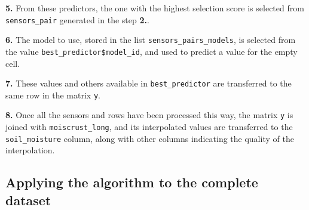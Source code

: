 \documentclass[]{article}
\newenvironment{Shaded}{\begin{snugshade}}{\end{snugshade}}
\newcommand{\DataTypeTok}[1]{\textcolor[rgb]{0.13,0.29,0.53}{#1}}
\newcommand{\DecValTok}[1]{\textcolor[rgb]{0.00,0.00,0.81}{#1}}
\newcommand{\KeywordTok}[1]{\textcolor[rgb]{0.13,0.29,0.53}{\textbf{#1}}}
\newcommand{\NormalTok}[1]{#1}
\newcommand{\OperatorTok}[1]{\textcolor[rgb]{0.81,0.36,0.00}{\textbf{#1}}}
\newcommand{\OtherTok}[1]{\textcolor[rgb]{0.56,0.35,0.01}{#1}}
\newcommand{\StringTok}[1]{\textcolor[rgb]{0.31,0.60,0.02}{#1}}
\begin{document}
\textbf{5.} From these predictors, the one with the highest selection
score is selected from \texttt{sensors\_pair} generated in the step
\textbf{2.}.

\begin{Shaded}
\end{Shaded}

\textbf{6.} The model to use, stored in the list
\texttt{sensors\_pairs\_models}, is selected from the value
\texttt{best\_predictor\$model\_id}, and used to predict a value for the
empty cell.

\begin{Shaded}
\end{Shaded}

\textbf{7.} These values and others available in
\texttt{best\_predictor} are transferred to the same row in the matrix
\texttt{y}.

\textbf{8.} Once all the sensors and rows have been processed this way,
the matrix \texttt{y} is joined with \texttt{moiscrust\_long}, and its
interpolated values are transferred to the \texttt{soil\_moisture}
column, along with other columns indicating the quality of the
interpolation.

\hypertarget{applying-the-algorithm-to-the-complete-dataset}{%
\subsection{Applying the algorithm to the complete
dataset}\label{applying-the-algorithm-to-the-complete-dataset}}
\end{document}

